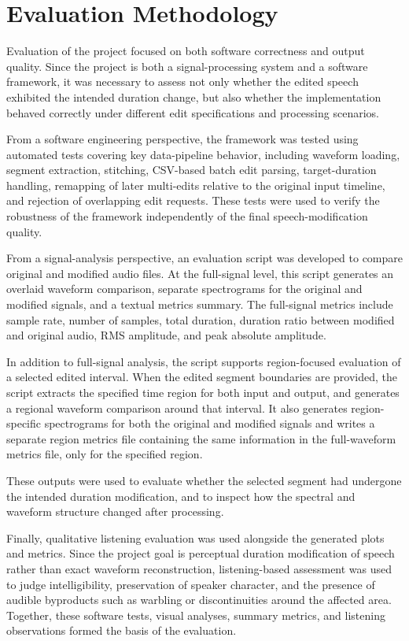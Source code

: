 \documentclass{article}
\begin{document}
\section{Evaluation Methodology}

Evaluation of the project focused on both software correctness and output quality. Since the project is both a signal-processing system and a software framework, it was necessary to assess not only whether the edited speech exhibited the intended duration change, but also whether the implementation behaved correctly under different edit specifications and processing scenarios.

From a software engineering perspective, the framework was tested using automated tests covering key data-pipeline behavior, including waveform loading, segment extraction, stitching, CSV-based batch edit parsing, target-duration handling, remapping of later multi-edits relative to the original input timeline, and rejection of overlapping edit requests. These tests were used to verify the robustness of the framework independently of the final speech-modification quality.

From a signal-analysis perspective, an evaluation script was developed to compare original and modified audio files. At the full-signal level, this script generates an overlaid waveform comparison, separate spectrograms for the original and modified signals, and a textual metrics summary. The full-signal metrics include sample rate, number of samples, total duration, duration ratio between modified and original audio, RMS amplitude, and peak absolute amplitude.

In addition to full-signal analysis, the script supports region-focused evaluation of a selected edited interval. When the edited segment boundaries are provided, the script extracts the specified time region for both input and output, and generates a regional waveform comparison around that interval. It also generates region-specific spectrograms for both the original and modified signals and writes a separate region metrics file containing the same information in the full-waveform metrics file, only for the specified region.

These outputs were used to evaluate whether the selected segment had undergone the intended duration modification, and to inspect how the spectral and waveform structure changed after processing.

Finally, qualitative listening evaluation was used alongside the generated plots and metrics. Since the project goal is perceptual duration modification of speech rather than exact waveform reconstruction, listening-based assessment was used to judge intelligibility, preservation of speaker character, and the presence of audible byproducts such as warbling or discontinuities around the affected area. Together, these software tests, visual analyses, summary metrics, and listening observations formed the basis of the evaluation.
\end{document}

